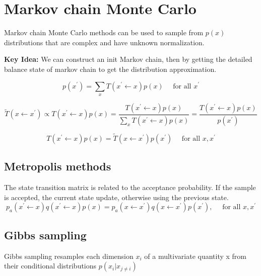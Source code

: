\documentclass{article}
\begin{document}
\section{Markov chain Monte Carlo}
Markov chain Monte Carlo methods can be used to sample from $p(x)$ distributions that are complex and have unknown normalization.

\textbf{Key Idea:} We can construct an init Markov chain, then by getting the detailed balance state of markov chain to get the distribution approximation.

\begin{equation}
    p\left(x^{\prime}\right)=\sum_{x} T\left(x^{\prime} \leftarrow x\right) p(x) \quad \text { for all } x^{\prime}
\end{equation}


\begin{equation}
    \widetilde{T}\left(x \leftarrow x^{\prime}\right) \propto T\left(x^{\prime} \leftarrow x\right) p(x)=\frac{T\left(x^{\prime} \leftarrow x\right) p(x)}{\sum_{x} T\left(x^{\prime} \leftarrow x\right) p(x)}=\frac{T\left(x^{\prime} \leftarrow x\right) p(x)}{p\left(x^{\prime}\right)}
\end{equation}

\begin{equation}
    T\left(x^{\prime} \leftarrow x\right) p(x)=\widetilde{T}\left(x \leftarrow x^{\prime}\right) p\left(x^{\prime}\right) \quad \text { for all } x, x^{\prime}
\end{equation}
\subsection{Metropolis methods}
The state transition matrix is related to the acceptance probability. If the sample is accepted, the current state update, otherwise using the previous state.
\begin{equation}
    p_{a}\left(x^{\prime} \leftarrow x\right) q\left(x^{\prime} \leftarrow x\right) p(x)=p_{a}\left(x \leftarrow x^{\prime}\right) q\left(x \leftarrow x^{\prime}\right) p\left(x^{\prime}\right), \quad \text { for all } x, x^{\prime}
\end{equation}

\subsection{Gibbs sampling}
Gibbs sampling resamples each dimension $x_i$ of a multivariate quantity x from their conditional distributions $p(x_i| x_{j \neq i})$
\end{document}
